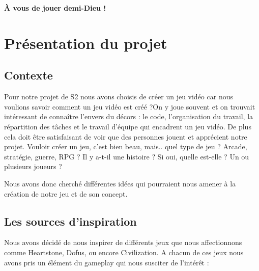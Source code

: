 \documentclass[12pt]{extarticle}
\begin{document}
\vspace{0.5cm}
\begin{center}\bfseries
	À vous de jouer demi-Dieu !
\end{center}

\newpage

\section{Présentation du projet}

\subsection{Contexte}

Pour notre projet de S2 nous avons choisis de créer un jeu vidéo car nous voulions savoir comment un jeu vidéo est créé ?On y joue souvent et on trouvait intéressant de connaître l’envers du décors : le code, l’organisation du travail, la répartition des tâches et le travail d’équipe qui encadrent un jeu vidéo. De plus cela doit être satisfaisant de voir que des personnes jouent et apprécient notre projet. Vouloir créer un jeu, c’est bien beau, mais.. quel type de jeu ? Arcade, stratégie, guerre, RPG ? Il y a-t-il une histoire ? Si oui, quelle est-elle ? Un ou plusieurs joueurs ?

Nous avons donc cherché différentes idées qui pourraient nous amener à la création de notre jeu et de son concept.

\subsection{Les sources d'inspiration}

Nous avons décidé de nous inspirer de différents jeux que nous affectionnons comme Heartstone, Dofus, ou encore Civilization. A chacun de ces jeux nous avons pris un élément du gameplay qui nous susciter de l’intérêt :
\end{document}

